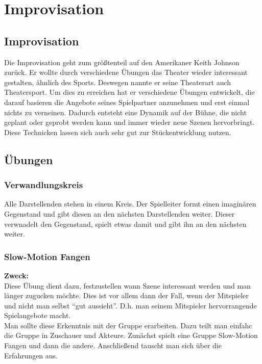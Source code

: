 \documentclass[ngerman, a4paper, twoside]{scrbook}%
\begin{document}
	\setcounter{chapter}{0}
	\setcounter{section}{0}
	\part{Improvisation}
	\chapter{Improvisation}
	Die Improvisation geht zum größtenteil auf den Amerikaner Keith Johnson zurück. Er wollte durch verschiedene Übungen das Theater wieder interessant gestalten, ähnlich des Sports. Deswegen nannte er seine Theaterart auch Theatersport. Um dies zu erreichen hat er verschiedene Übungen entwickelt, die darauf basieren die Angebote seines Spielpartner anzunehmen und erst einmal nichts zu verneinen. Dadurch entsteht eine Dynamik auf der Bühne, die nicht geplant oder geprobt werden kann und immer wieder neue Szenen hervorbringt. \\
	Diese Technicken lassen sich auch sehr gut zur Stückentwicklung nutzen.

	\chapter{Übungen}
	\section{Verwandlungskreis}
	Alle Darstellenden stehen in einem Kreis. Der Spielleiter formt einen imaginären Gegenstand und gibt diesen an den nächsten Darstellenden weiter. Dieser verwnadelt den Gegenstand, spielt etwas damit und gibt ihn an den nächsten weiter.

	\section{Slow-Motion Fangen}
	\textbf{Zweck:}\\
	Diese Übung dient dazu, festzustellen wann Szene interessant werden und man länger zugucken möchte. Dies ist vor allem dann der Fall, wenn der Mitspieler und nicht man selbst "`gut aussieht"'. D.h. man seinem Mitspieler hervorrangende Spielangebote macht. \\
	Man sollte diese Erkenntnis mit der Gruppe erarbeiten. Dazu teilt man einfahc die Gruppe in Zuschauer und Akteure. Zunächst spielt eine Gruppe Slow-Motion Fangen und dann die andere. Anschließend tauscht man sich über die Erfahrungen aus.\\
\end{document}
